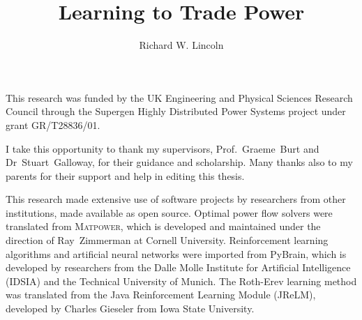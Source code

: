 \documentclass[12pt]{strath_thesis}
\title{Learning to Trade Power}
\author{Richard W. Lincoln}
\begin{document}
\maketitle

\setcounter{page}{1}

\declaration

\begin{acknowledgements}
This research was funded by the UK Engineering and Physical Sciences Research
Council through the Supergen Highly Distributed Power Systems project under
grant GR/T28836/01.

I take this opportunity to thank my supervisors, Prof.~Graeme~Burt and
Dr~Stuart~Galloway, for their guidance and scholarship.  Many thanks also to
my parents for their support and help in editing this thesis.

This research made extensive use of software projects by researchers from other
institutions, made available as open source.  Optimal power flow solvers
were translated from \textsc{Matpower}, which is developed and maintained under the
direction of Ray~Zimmerman at Cornell University.  Reinforcement learning
algorithms and artificial neural networks were imported from PyBrain, which is
developed by researchers from the Dalle Molle Institute for Artificial
Intelligence (IDSIA) and the Technical University of Munich.  The Roth-Erev
learning method was translated from the Java Reinforcement Learning Module
(JReLM), developed by Charles Gieseler from Iowa State University.
\end{acknowledgements}
\end{document}
